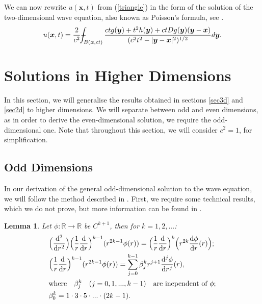 \documentclass[a4paper, 12pt]{article}
\def\Xint#1{\mathchoice
{\XXint\displaystyle\textstyle{#1}}%
{\XXint\textstyle\scriptstyle{#1}}%
{\XXint\scriptstyle\scriptscriptstyle{#1}}%
{\XXint\scriptscriptstyle\scriptscriptstyle{#1}}%
\!\int}
\def\XXint#1#2#3{{\setbox0=\hbox{$#1{#2#3}{\int}$ }
\vcenter{\hbox{$#2#3$ }}\kern-.6\wd0}}
\def\dashint{\Xint-}
\numberwithin{equation}{section}
\begin{document}
We can now rewrite $u(\boldsymbol{x},t)$ from (\ref{triangle}) in the form of
the solution of the two-dimensional wave equation, also known as Poisson's
formula, see \cite[Ch. 2.4.1.c]{Ev}.
\begin{equation} \label{poiss}
    u(\boldsymbol{x},t)=\frac{2}{c^2}\dashint_{B(\boldsymbol{x},ct)} \frac{ctg(\boldsymbol{y})+t^2h(\boldsymbol{y})+ctDg(\boldsymbol{y})(\boldsymbol{y}-\boldsymbol{x})}{(c^2t^2-|\boldsymbol{y}-\boldsymbol{x}|^2)^{1/2}}d\boldsymbol{y}.
\end{equation}

\section{Solutions in Higher Dimensions}

In this section, we will generalise the results obtained in sections \ref{sec3d}
and \ref{sec2d} to higher dimensions. We will separate between odd and
even dimensions, as in order to derive the even-dimensional solution, we require the
odd-dimensional one. Note that throughout this section, we will consider
$c^2=1$, for simplification.

\subsection{Odd Dimensions}

In our derivation of the general odd-dimensional solution to the wave equation,
we will follow the method described in \cite[Ch. 2.4.1.d]{Ev}. First, we require some
technical results, which we do not prove, but more information can be found in
\cite[Ch. 2.4.1.d, Lemma 2]{Ev}. 


\newtheorem{lemma}{Lemma}
\begin{lemma} \label{lemma}
    Let $\phi:\mathbb{R} \to \mathbb{R}$ be $C^{k+1}$, then for $k=1, 2, ...$:
    \begin{align}
        &\Big(\diff[2]{}{r}\Big)\Big( \frac{1}{r} \diff{}{r}\Big)^{k-1}(r^{2k-1}\phi(r))=\Big( \frac{1}{r} \diff{}{r}\Big)^k \Big(r^{2k} \diff{\phi}{r}(r) \Big); \label{i}\\
        &\Big( \frac{1}{r} \diff{}{r}\Big)^{k-1}(r^{2k-1}\phi(r))=\sum^{k-1}_{j=0} \beta_{j}^{k} r^{j+1} \diff[j]{\phi}{r}(r), \label{ii} \\
        &\textrm{where} \quad \beta_{j}^{k} \quad (j=0,1,...,k-1) \quad \textrm{are inependent of $\phi$}; \nonumber \\
        &\beta_{0}^{k}=1 \cdot 3 \cdot 5 \cdot ... \cdot (2k-1). \label{iii}
    \end{align}
\end{lemma}
\end{document}
